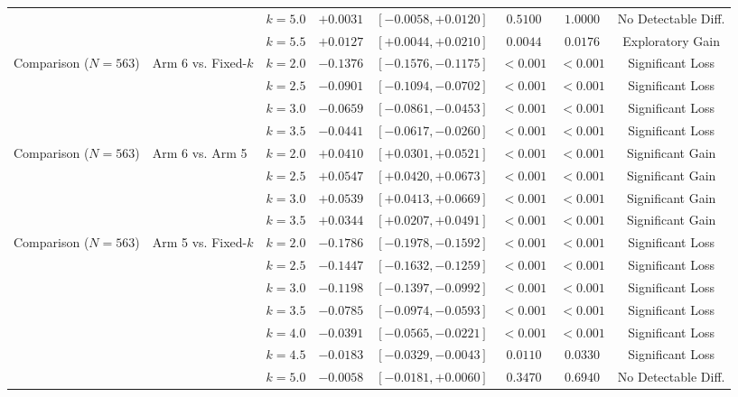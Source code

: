 \documentclass{article}
\begin{document}
\begin{table}[t]
{\begin{tabular}{lllccccc}
 & & $k=5.0$ & $+0.0031$ & $[-0.0058, +0.0120]$ & $0.5100$ & $1.0000$ & No Detectable Diff. \\
 & & $k=5.5$ & $+0.0127$ & $[+0.0044, +0.0210]$ & $0.0044$ & $0.0176$ & Exploratory Gain \\
\hline
Comparison ($N=563$) & Arm 6 vs. Fixed-$k$
   & $k=2.0$ & $-0.1376$ & $[-0.1576, -0.1175]$ & $<0.001$ & $<0.001$ & Significant Loss \\
 & & $k=2.5$ & $-0.0901$ & $[-0.1094, -0.0702]$ & $<0.001$ & $<0.001$ & Significant Loss \\
 & & $k=3.0$ & $-0.0659$ & $[-0.0861, -0.0453]$ & $<0.001$ & $<0.001$ & Significant Loss \\
 & & $k=3.5$ & $-0.0441$ & $[-0.0617, -0.0260]$ & $<0.001$ & $<0.001$ & Significant Loss \\
\hline
Comparison ($N=563$) & Arm 6 vs. Arm 5
   & $k=2.0$ & $+0.0410$ & $[+0.0301, +0.0521]$ & $<0.001$ & $<0.001$ & Significant Gain \\
 & & $k=2.5$ & $+0.0547$ & $[+0.0420, +0.0673]$ & $<0.001$ & $<0.001$ & Significant Gain \\
 & & $k=3.0$ & $+0.0539$ & $[+0.0413, +0.0669]$ & $<0.001$ & $<0.001$ & Significant Gain \\
 & & $k=3.5$ & $+0.0344$ & $[+0.0207, +0.0491]$ & $<0.001$ & $<0.001$ & Significant Gain \\
\hline
Comparison ($N=563$) & Arm 5 vs. Fixed-$k$
   & $k=2.0$ & $-0.1786$ & $[-0.1978, -0.1592]$ & $<0.001$ & $<0.001$ & Significant Loss \\
 & & $k=2.5$ & $-0.1447$ & $[-0.1632, -0.1259]$ & $<0.001$ & $<0.001$ & Significant Loss \\
 & & $k=3.0$ & $-0.1198$ & $[-0.1397, -0.0992]$ & $<0.001$ & $<0.001$ & Significant Loss \\
 & & $k=3.5$ & $-0.0785$ & $[-0.0974, -0.0593]$ & $<0.001$ & $<0.001$ & Significant Loss \\
 & & $k=4.0$ & $-0.0391$ & $[-0.0565, -0.0221]$ & $<0.001$ & $<0.001$ & Significant Loss \\
 & & $k=4.5$ & $-0.0183$ & $[-0.0329, -0.0043]$ & $0.0110$ & $0.0330$ & Significant Loss \\
 & & $k=5.0$ & $-0.0058$ & $[-0.0181, +0.0060]$ & $0.3470$ & $0.6940$ & No Detectable Diff. \\
\hline
\end{tabular}%
}
\vspace{1ex}
\begin{flushleft}

\end{flushleft}
\end{table}
\end{document}
